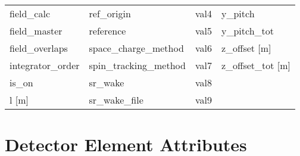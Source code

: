 \begin{tabular}{llll}
field_calc                       & ref_origin                       & val4                             & y_pitch                          \\
field_master                     & reference                        & val5                             & y_pitch_tot                      \\
field_overlaps                   & space_charge_method              & val6                             & z_offset [m]                     \\
integrator_order                 & spin_tracking_method             & val7                             & z_offset_tot [m]                 \\
is_on                            & sr_wake                          & val8                             &                                  \\
l [m]                            & sr_wake_file                     & val9                             &                                  \\
 \bottomrule
 \end{tabular}
 \vfill
 
 \section{Detector Element Attributes}
 \label{s:list.detector}
 
